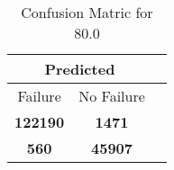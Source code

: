 \begin{table}[] 
\caption{Confusion Matric for 80.0} 
\label{Table: Prediction Accuracy-DMD80.0OnlySunEKF-resetReflectionEKF-top2perfectNoFailurePrediction-Reflection} 
\centering 
\begin{tabular} 
 {@{}ccc@{}} 
\toprule 
\multicolumn{2}{c}{\textbf{Predicted}}
 \\ \midrule 
\multicolumn{1}{|c|}{Failure} & 
\multicolumn{1}{c|}{No Failure}
 \\ \midrule 
\multicolumn{1}{|c|}{\color{green}\textbf{122190}} & 
\multicolumn{1}{c|}{\color{red}\textbf{1471}}
 \\ \midrule 
\multicolumn{1}{|c|}{\color{red}\textbf{560}} & 
\multicolumn{1}{c|}{\color{green}\textbf{45907}}
 \\ \bottomrule 
\end{tabular} 
\end{table} 
